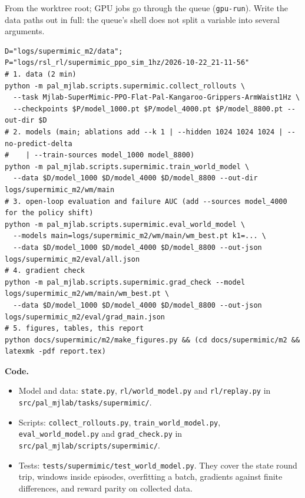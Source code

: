 \documentclass[10pt]{article}
\begin{document}
From the worktree root; GPU jobs go through the queue (\texttt{gpu-run}). Write the data paths out
in full: the queue's shell does not split a variable into several arguments.
\begin{footnotesize}
\begin{verbatim}
D="logs/supermimic_m2/data"; P="logs/rsl_rl/supermimic_ppo_sim_1hz/2026-10-22_21-11-56"
# 1. data (2 min)
python -m pal_mjlab.scripts.supermimic.collect_rollouts \
  --task Mjlab-SuperMimic-PPO-Flat-Pal-Kangaroo-Grippers-ArmWaist1Hz \
  --checkpoints $P/model_1000.pt $P/model_4000.pt $P/model_8800.pt --out-dir $D
# 2. models (main; ablations add --k 1 | --hidden 1024 1024 1024 | --no-predict-delta
#    | --train-sources model_1000 model_8800)
python -m pal_mjlab.scripts.supermimic.train_world_model \
  --data $D/model_1000 $D/model_4000 $D/model_8800 --out-dir logs/supermimic_m2/wm/main
# 3. open-loop evaluation and failure AUC (add --sources model_4000 for the policy shift)
python -m pal_mjlab.scripts.supermimic.eval_world_model \
  --models main=logs/supermimic_m2/wm/main/wm_best.pt k1=... \
  --data $D/model_1000 $D/model_4000 $D/model_8800 --out-json logs/supermimic_m2/eval/all.json
# 4. gradient check
python -m pal_mjlab.scripts.supermimic.grad_check --model logs/supermimic_m2/wm/main/wm_best.pt \
  --data $D/model_1000 $D/model_4000 $D/model_8800 --out-json logs/supermimic_m2/eval/grad_main.json
# 5. figures, tables, this report
python docs/supermimic/m2/make_figures.py && (cd docs/supermimic/m2 && latexmk -pdf report.tex)
\end{verbatim}
\end{footnotesize}

\textbf{Code.}
{\raggedright
\begin{itemize}
  \item Model and data: \texttt{state.py}, \texttt{rl/world\_model.py} and \texttt{rl/replay.py} in
  \texttt{src/pal\_mjlab/tasks/supermimic/}.
  \item Scripts: \texttt{collect\_rollouts.py}, \texttt{train\_world\_model.py},
  \texttt{eval\_world\_model.py} and \texttt{grad\_check.py} in
  \texttt{src/pal\_mjlab/scripts/supermimic/}.
  \item Tests: \texttt{tests/supermimic/test\_world\_model.py}. They cover the state round trip, windows
  inside episodes, overfitting a batch, gradients against finite differences, and reward parity on
  collected data.
\end{itemize}
}
\end{document}
